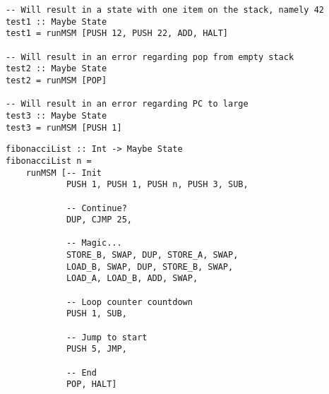 \documentclass[10pt, a4paper]{article}
\begin{document}
\begin{lstlisting}
-- Will result in a state with one item on the stack, namely 42
test1 :: Maybe State
test1 = runMSM [PUSH 12, PUSH 22, ADD, HALT]

-- Will result in an error regarding pop from empty stack
test2 :: Maybe State
test2 = runMSM [POP]

-- Will result in an error regarding PC to large
test3 :: Maybe State
test3 = runMSM [PUSH 1]
\end{lstlisting}

\begin{lstlisting}
fibonacciList :: Int -> Maybe State
fibonacciList n = 
    runMSM [-- Init
            PUSH 1, PUSH 1, PUSH n, PUSH 3, SUB,
            
            -- Continue?
            DUP, CJMP 25,
            
            -- Magic...
            STORE_B, SWAP, DUP, STORE_A, SWAP,
            LOAD_B, SWAP, DUP, STORE_B, SWAP,
            LOAD_A, LOAD_B, ADD, SWAP,
            
            -- Loop counter countdown
            PUSH 1, SUB,
            
            -- Jump to start
            PUSH 5, JMP,
            
            -- End
            POP, HALT]
\end{lstlisting}
\end{document}

